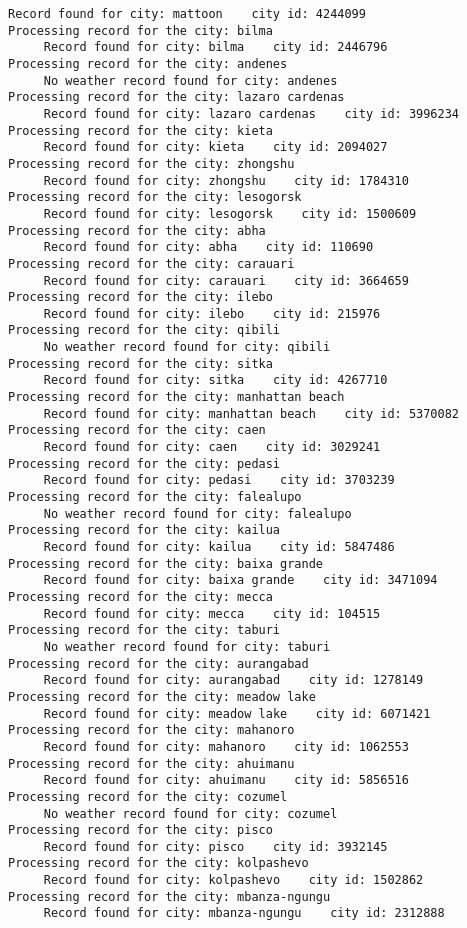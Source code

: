 \documentclass[11pt]{article}
\begin{document}
\begin{Verbatim}[commandchars=\\\{\}]
     Record found for city: mattoon    city id: 4244099
Processing record for the city: bilma
     Record found for city: bilma    city id: 2446796
Processing record for the city: andenes
     No weather record found for city: andenes
Processing record for the city: lazaro cardenas
     Record found for city: lazaro cardenas    city id: 3996234
Processing record for the city: kieta
     Record found for city: kieta    city id: 2094027
Processing record for the city: zhongshu
     Record found for city: zhongshu    city id: 1784310
Processing record for the city: lesogorsk
     Record found for city: lesogorsk    city id: 1500609
Processing record for the city: abha
     Record found for city: abha    city id: 110690
Processing record for the city: carauari
     Record found for city: carauari    city id: 3664659
Processing record for the city: ilebo
     Record found for city: ilebo    city id: 215976
Processing record for the city: qibili
     No weather record found for city: qibili
Processing record for the city: sitka
     Record found for city: sitka    city id: 4267710
Processing record for the city: manhattan beach
     Record found for city: manhattan beach    city id: 5370082
Processing record for the city: caen
     Record found for city: caen    city id: 3029241
Processing record for the city: pedasi
     Record found for city: pedasi    city id: 3703239
Processing record for the city: falealupo
     No weather record found for city: falealupo
Processing record for the city: kailua
     Record found for city: kailua    city id: 5847486
Processing record for the city: baixa grande
     Record found for city: baixa grande    city id: 3471094
Processing record for the city: mecca
     Record found for city: mecca    city id: 104515
Processing record for the city: taburi
     No weather record found for city: taburi
Processing record for the city: aurangabad
     Record found for city: aurangabad    city id: 1278149
Processing record for the city: meadow lake
     Record found for city: meadow lake    city id: 6071421
Processing record for the city: mahanoro
     Record found for city: mahanoro    city id: 1062553
Processing record for the city: ahuimanu
     Record found for city: ahuimanu    city id: 5856516
Processing record for the city: cozumel
     No weather record found for city: cozumel
Processing record for the city: pisco
     Record found for city: pisco    city id: 3932145
Processing record for the city: kolpashevo
     Record found for city: kolpashevo    city id: 1502862
Processing record for the city: mbanza-ngungu
     Record found for city: mbanza-ngungu    city id: 2312888

\end{Verbatim}
\end{document}
